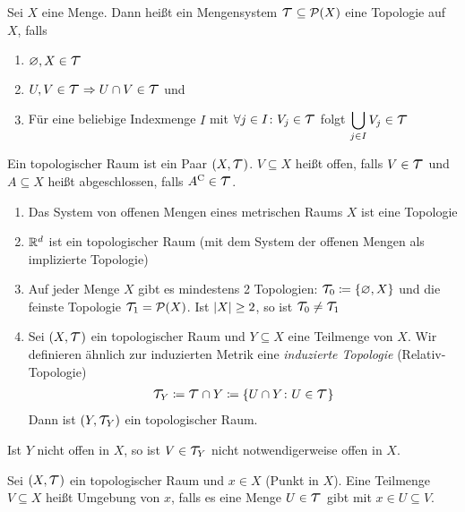 \begin{definition}[Topologie]
    Sei $X$ eine Menge. Dann heißt ein Mengensystem $\Tau\sbset\mathcal{P}\of{X}$ eine Topologie auf $X$, falls
    \begin{enumerate}[label=(\roman*)]
        \item $\emptyset, X\in\Tau$
        \item $U, V\in \Tau \impl U \cap V \in \Tau$ und
        \item Für eine beliebige Indexmenge $I$ mit $\forall j\in I\colon V_j \in \Tau$ folgt $\displaystyle\bigcup_{j\in I} V_j \in \Tau$
    \end{enumerate}
    Ein topologischer Raum ist ein Paar $\pair{X, \Tau}$. $V\subseteq X$ heißt offen, falls $V\in\Tau$ und $A\subseteq X$ heißt abgeschlossen, falls $A^{\mathrm{C}} \in\Tau$.
\end{definition}

\begin{beispiel}
    \theoremescape
    \begin{enumerate}
        \item Das System von offenen Mengen eines metrischen Raums $X$ ist eine Topologie
        \item $\mathbb{R}^d$ ist ein topologischer Raum (mit dem System der offenen Mengen als implizierte Topologie)
        \item Auf jeder Menge $X$ gibt es mindestens 2 Topologien: $\Tau_0 \coloneqq \set{\emptyset, X}$ und die feinste Topologie $\Tau_1 = \mathcal{P}\of{X}$. Ist $\left\lvert X\right\rvert \geq 2$, so ist $\Tau_0 \neq \Tau_1$
        \item Sei $\pair{X, \Tau}$ ein topologischer Raum und $Y\subseteq X$ eine Teilmenge von $X$. Wir definieren ähnlich zur induzierten Metrik eine \emph{induzierte Topologie} (Relativ-Topologie)
        \begin{align*}
            \Tau_{Y} \coloneqq \Tau \cap Y \coloneqq \set{U \cap Y \colon U\in \Tau}
        \end{align*}
        Dann ist $\pair{Y, \Tau_Y}$ ein topologischer Raum.
    \end{enumerate}
\end{beispiel}

\begin{bemerkung}
    Ist $Y$ nicht offen in $X$, so ist $V\in \Tau_Y$ nicht notwendigerweise offen in $X$.
\end{bemerkung}

\begin{definition}[Umgebung]
    Sei $\pair{X, \Tau}$ ein topologischer Raum und $x\in X$ (Punkt in $X$). Eine Teilmenge $V\subseteq X$ heißt Umgebung von $x$, falls es eine Menge $U\in\Tau$ gibt mit $x\in U \subseteq V$.
\end{definition}

